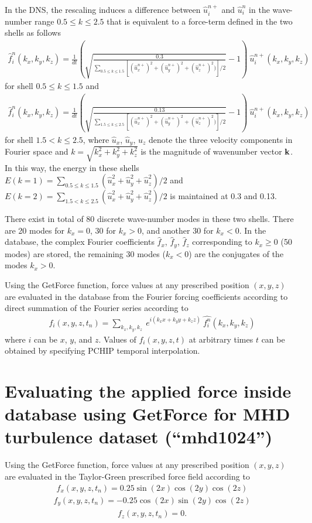 \documentclass[11pt]{article}
\def\bea{\begin{eqnarray}}
\def\eea{\end{eqnarray}}
\begin{document}
In the DNS, the rescaling induces a difference between $\hat{u}_i^{n+}$ and $\hat{u}_i^{n}$ in the wave-number range $0.5\leq k\leq 2.5$  that is equivalent to a force-term
defined in the two shells as follows
\bea
 \hat {f}^n_i(k_x,k_y,k_z)=\frac{1}{dt} \left(\sqrt{\frac{0.3}{\sum_{0.5\leq k \leq 1.5}[(\hat {u}^{n+}_x)^2+(\hat {u}^{n+}_y)^2+(\hat {u}^{n+}_z)^2)]/2}}-1\right)~\hat {u}^{n+}_i(k_x,k_y,k_z)
\eea
for shell $0.5\leq k \leq 1.5$ and
\bea
 \hat {f}^n_i(k_x,k_y,k_z)=\frac{1}{dt} \left(\sqrt{\frac{0.13}{\sum_{1.5\leq k \leq 2.5}[(\hat {u}^{n+}_x)^2+(\hat {u}^{n+}_y)^2+(\hat {u}^{n+}_z)^2)]/2}}-1\right)~\hat {u}^{n+}_i(k_x,k_y,k_z)
\eea
for shell $1.5< k \leq 2.5$, where $\hat u_x$,  $\hat u_y$,  $\hat u_z$ denote the three velocity components in Fourier space and   $k=\sqrt{k_x^2+k_y^2+k_z^2}$ is the magnitude of wavenumber vector ${\bf  k}$. In this way, the energy in these shells $E(k=1)=\sum_{0.5\leq k \leq 1.5}(\hat {u}_x^2+\hat {u}_y^2+\hat {u}_z^2)/2$ and $E(k=2)=\sum_{1.5< k \leq 2.5}(\hat {u}_x^2+\hat {u}_y^2+\hat {u}_z^2)/2$ is maintained at 0.3 and 0.13.

There exist in total of 80 discrete wave-number modes in these two shells. There are 20 modes for $k_x=0$, 30 for $k_x>0$, and another 30 for $k_x<0$. In the database, the complex Fourier coefficients $\hat f_x$, $\hat f_y$, $\hat f_z$ corresponding to $k_x\geq 0$ (50 modes) are stored, the remaining 30 modes ($k_x<0$) are the conjugates of the modes $k_x>0$.

Using the GetForce function, force values at any prescribed position $(x,y,z)$ are evaluated in the database from the Fourier forcing coefficients according to direct summation of the Fourier series according to
\bea
f_i(x,y,z,t_n)= \sum_{k_x,k_y,k_z} ~e^{i(k_xx+k_yy+k_zz)}~\hat {f^n_i}(k_x,k_y,k_z)
\eea
where $i$ can be $x$, $y$, and $z$. Values of $f_i(x,y,z,t)$ at arbitrary times $t$ can be obtained by specifying PCHIP temporal interpolation.

\section{Evaluating the applied force inside database using GetForce for MHD turbulence dataset (``mhd1024'')}

Using the GetForce function, force values at any prescribed position $(x,y,z)$ are evaluated in the Taylor-Green prescribed force field according to
\bea
f_x(x,y,z,t_n)= 0.25 \sin(2x)\cos(2y)\cos(2z)
\eea
\bea
f_y(x,y,z,t_n)=  - 0.25 \cos(2x)\sin(2y)\cos(2z)
\eea
\bea
f_z(x,y,z,t_n)= 0.
\eea
 
\end{document}
